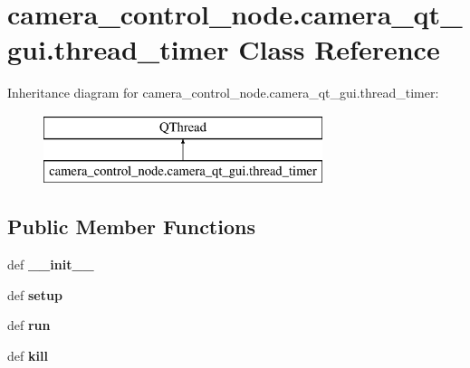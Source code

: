 \hypertarget{classcamera__control__node_1_1camera__qt__gui_1_1thread__timer}{\section{camera\-\_\-control\-\_\-node.\-camera\-\_\-qt\-\_\-gui.\-thread\-\_\-timer Class Reference}
\label{classcamera__control__node_1_1camera__qt__gui_1_1thread__timer}
}
Inheritance diagram for camera\-\_\-control\-\_\-node.\-camera\-\_\-qt\-\_\-gui.\-thread\-\_\-timer\-:\begin{figure}[H]
\begin{center}
\leavevmode
\includegraphics[height=2.000000cm]{classcamera__control__node_1_1camera__qt__gui_1_1thread__timer}
\end{center}
\end{figure}
\subsection*{Public Member Functions}
\begin{DoxyCompactItemize}
\item 
\hypertarget{classcamera__control__node_1_1camera__qt__gui_1_1thread__timer_ab0b7ba23d48e2ecf4573c10230b8d365}{def {\bfseries \-\_\-\-\_\-init\-\_\-\-\_\-}}\label{classcamera__control__node_1_1camera__qt__gui_1_1thread__timer_ab0b7ba23d48e2ecf4573c10230b8d365}

\item 
\hypertarget{classcamera__control__node_1_1camera__qt__gui_1_1thread__timer_a9c92d15e574110bdb76ae78195a5c752}{def {\bfseries setup}}\label{classcamera__control__node_1_1camera__qt__gui_1_1thread__timer_a9c92d15e574110bdb76ae78195a5c752}

\item 
\hypertarget{classcamera__control__node_1_1camera__qt__gui_1_1thread__timer_ab6b55f19686e1f1396818bffabf8b411}{def {\bfseries run}}\label{classcamera__control__node_1_1camera__qt__gui_1_1thread__timer_ab6b55f19686e1f1396818bffabf8b411}

\item 
\hypertarget{classcamera__control__node_1_1camera__qt__gui_1_1thread__timer_ae2e902561cf8cb59bb35f4adfecd2e4e}{def {\bfseries kill}}\label{classcamera__control__node_1_1camera__qt__gui_1_1thread__timer_ae2e902561cf8cb59bb35f4adfecd2e4e}

\end{DoxyCompactItemize}
